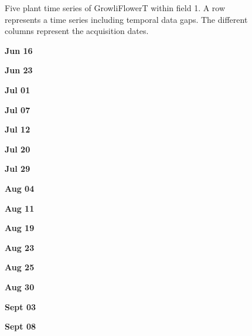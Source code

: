 \documentclass{article}
\begin{document}
\begin{figure}[t]
\caption{Five plant time series of GrowliFlowerT within field 1. A row represents a time series including temporal data gaps. The different columns represent the acquisition dates.} 
	\label{fig:timeSeries_others_field1}
\end{figure}


\begin{figure}[t]
	\centering
	 \begin{minipage}{0.06\textwidth}
	 \centering
	 \textbf{Jun 16}
	 \end{minipage}
	 \begin{minipage}{0.06\textwidth}
	 	 \centering
	 \textbf{Jun 23}
	 \end{minipage}
	 \begin{minipage}{0.06\textwidth}
	 	 \centering
	 \textbf{Jul 01}
	 \end{minipage}
	 \begin{minipage}{0.06\textwidth}
	 	 \centering
	 \textbf{Jul 07}
	 \end{minipage}
	 \begin{minipage}{0.06\textwidth}
	 	 \centering
	 \textbf{Jul 12}
	 \end{minipage}
	 \begin{minipage}{0.06\textwidth}
	 	 \centering
	 \textbf{Jul 20}
	 \end{minipage}
	 \begin{minipage}{0.06\textwidth}
	 	 \centering
	 \textbf{Jul 29}
	 \end{minipage}
	 \begin{minipage}{0.06\textwidth}
	 	 \centering
	 \textbf{Aug 04}
	 \end{minipage}
	 \begin{minipage}{0.06\textwidth}
	 \centering
	 \textbf{Aug 11}
	 \end{minipage}
	 \begin{minipage}{0.06\textwidth}
	 \centering
	 \textbf{Aug 19}
	 \end{minipage}
	 \begin{minipage}{0.06\textwidth}
	 \centering
	 \textbf{Aug 23}
	 \end{minipage}
	 \begin{minipage}{0.06\textwidth}
	 \centering
	 \textbf{Aug 25}
	 \end{minipage}
	 \begin{minipage}{0.06\textwidth}
	 \centering
	 \textbf{Aug 30}
	 \end{minipage}
	 \begin{minipage}{0.06\textwidth}
	 \centering
	 \textbf{Sept 03}
	 \end{minipage}
	 \begin{minipage}{0.06\textwidth}
	 \centering
	 \textbf{Sept 08}
	 \end{minipage}
	 

\end{figure}
\end{document}
